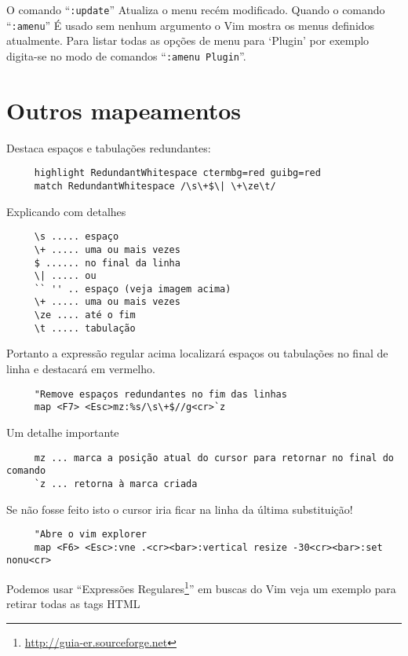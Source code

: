 {\Large {}} O comando ``{\tt :update}'' Atualiza o menu recém modificado.  Quando o comando
``{\tt :amenu}'' É usado sem nenhum argumento o Vim mostra os menus definidos
atualmente.  Para listar todas as opções de menu para `Plugin' por exemplo
digita-se no modo de comandos ``{\tt :amenu Plugin}''.

\section{Outros mapeamentos}
\label{Outros mapeamentos}

Destaca espaços e tabulações redundantes:

\begin{verbatim}
     highlight RedundantWhitespace ctermbg=red guibg=red
     match RedundantWhitespace /\s\+$\| \+\ze\t/
\end{verbatim}

Explicando com detalhes

\begin{verbatim}
     \s ..... espaço
     \+ ..... uma ou mais vezes
     $ ...... no final da linha
     \| ..... ou
     `` '' .. espaço (veja imagem acima)
     \+ ..... uma ou mais vezes
     \ze .... até o fim
     \t ..... tabulação
\end{verbatim}

Portanto a expressão regular acima localizará espaços ou tabulações no final de linha
e destacará em vermelho.


\begin{verbatim}
     "Remove espaços redundantes no fim das linhas
     map <F7> <Esc>mz:%s/\s\+$//g<cr>`z
\end{verbatim}

Um detalhe importante

\begin{verbatim}
     mz ... marca a posição atual do cursor para retornar no final do comando
     `z ... retorna à marca criada
\end{verbatim}

Se não fosse feito isto o cursor iria ficar na linha da última substituição!

\begin{verbatim}
     "Abre o vim explorer
     map <F6> <Esc>:vne .<cr><bar>:vertical resize -30<cr><bar>:set nonu<cr>
\end{verbatim}

Podemos usar ``Expressões Regulares\footnote{\url{http://guia-er.sourceforge.net}}'' em
buscas do Vim veja um exemplo para retirar todas as tags HTML

